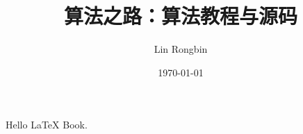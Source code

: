 \documentclass{wta}
\title{算法之路：算法教程与源码}
\author{Lin Rongbin}
\date{\today}
\begin{document}
Hello \LaTeX{} Book.
\end{document}
